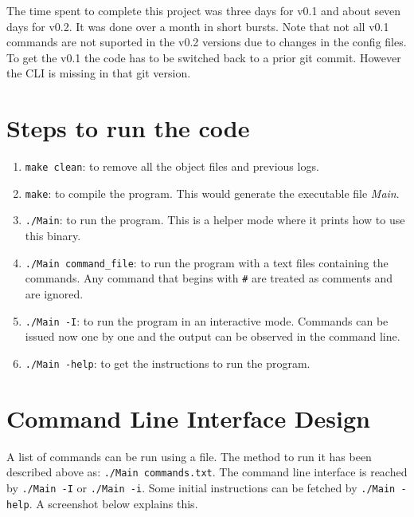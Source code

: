\documentclass[letterpaper]{article}
\begin{document}
The time spent to complete this project was three days for v0.1 and about seven days for v0.2. It was done over a month in short bursts. Note that not all v0.1 commands are not suported in the v0.2 versions due to changes in the config files. To get the v0.1 the code has to be switched back to a prior git commit. However the CLI is missing in that git version. 

\section{Steps to run the code}

\begin{enumerate}
	\item \texttt{make clean}: to remove all the object files and previous logs.
	\item \texttt{make}: to compile the program. This would generate the executable file \textit{Main}.
	\item \texttt{./Main}: to run the program. This is a helper mode where it prints how to use this binary. 
	\item \texttt{./Main command\_file}: to run the program with a text files containing the commands. Any command that begins with \texttt{\#} are treated as comments and are ignored. 
	\item \texttt{./Main -I}: to run the program in an interactive mode. Commands can be issued now one by one and the output can be observed in the command line. 
	\item \texttt{./Main -help}: to get the instructions to run the program.
\end{enumerate}



\section{Command Line Interface Design}

A list of commands can be run using a file. The method to run it has been described above as: \texttt{./Main commands.txt}. The command line interface is reached by \texttt{./Main -I} or \texttt{./Main -i}. Some initial instructions can be fetched by \texttt{./Main -help}. A screenshot below explains this. 
\end{document}
